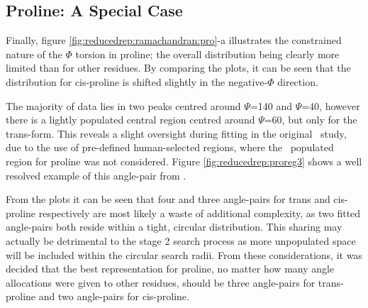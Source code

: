 \renewcommand{\anglesetscale}{0.408}

\subsection{Proline: A Special Case}

Finally, figure \ref{fig:reducedrep:ramachandran:pro}-a illustrates the constrained nature of the $\Phi$ torsion in proline; the overall distribution being clearly more limited than for other residues. By comparing the plots, it can be seen that the distribution for cis-proline is shifted slightly in the negative-$\Phi$ direction. 

The majority of data lies in two peaks centred around $\Psi$=140 and $\Psi$=40, however there is a lightly populated central region centred around $\Psi$=60, but only for the trans-form. This reveals a slight oversight during fitting in the original \raft\ study, due to the use of  pre-defined human-selected regions, where the \third\ populated region for proline was not considered. Figure \ref{fig:reducedrep:proreg3} shows a well resolved example of this angle-pair from \thothdb. 

From the plots it can be seen that four and three angle-pairs for trans and cis-proline respectively are most likely a waste of additional complexity, as two fitted angle-pairs both reside within a tight, circular distribution. This sharing may actually be detrimental to the stage 2 search process as more unpopulated space will be included within the circular search radii. From these considerations, it was decided that the best representation for proline, no matter how many angle allocations were given to other residues, should be three angle-pairs for trans-proline and two angle-pairs for cis-proline.



